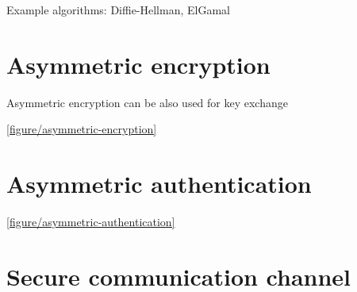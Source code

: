Example algorithms: Diffie-Hellman, ElGamal


\section{Asymmetric encryption}

Asymmetric encryption can be also used for key exchange


\autoref{figure/asymmetric-encryption}




\section{Asymmetric authentication}


\autoref{figure/asymmetric-authentication}




\section{Secure communication channel}


